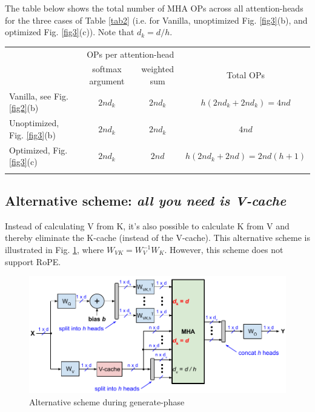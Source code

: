 \documentclass{article}
\newcommand{\mc}[2]{\multicolumn{#1}{c}{#2}}  %
\def\fline{\Xhline{2\arrayrulewidth}} %
\begin{document}
The table below shows the total number of MHA OPs across all attention-heads for the three cases of Table \ref{tab2} (i.e. for Vanilla, unoptimized Fig. \ref{fig3}(b), and optimized Fig. \ref{fig3}(c)). Note that $d_k = d / h$.
\begingroup \renewcommand{\arraystretch}{1.3} %
\begin{table}[h!] \centering \begin{tabular}{lccc} \fline
                                  & \mc{2}{OPs per attention-head}   &                            \\
                                  & softmax argument & weighted sum  & Total OPs                  \\ \hline
  Vanilla, see Fig. \ref{fig2}(b) & $2nd_k$          & $2nd_k$       & $h(2nd_k + 2nd_k) = 4nd$    \\
  Unoptimized, Fig. \ref{fig3}(b) & $2nd_k$          & $2nd_k$       & $4nd$                       \\
  Optimized, Fig. \ref{fig3}(c)   & $2nd_k$          & $2nd$         & $h(2nd_k + 2nd) = 2nd(h+1)$ \\ \fline
\end{tabular} \end{table} \endgroup

\subsection*{Alternative scheme: \emph{all you need is V-cache}}
Instead of calculating V from K, it's also possible to calculate K from V and thereby eliminate the K-cache (instead of the V-cache). This alternative scheme is illustrated in Fig. \ref{fig6}, where $W_{VK} = W_V^{-1} W_K$. However, this scheme does not support RoPE.
\begin{figure}[h!] \centering
  \includegraphics[scale=0.88]{../doc/fig/slimAttn_fig6.pdf}
  \caption{Alternative scheme during generate-phase}
\label{fig6} \end{figure}
\end{document}
